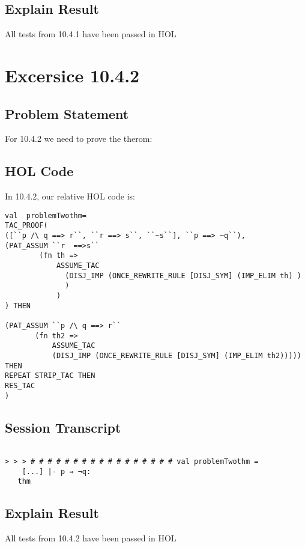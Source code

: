 \documentclass{report}
\begin{document}
\section{Explain Result}
\label{explain result 1041}
All tests from 10.4.1 have been passed in HOL



\chapter{Excersice 10.4.2}
\label{Ex 1042}
\section{Problem Statement}
\label{Problem State 1042}
For 10.4.2 we need to prove the therom:

\HOLexerciseOneZeroTheoremsproblemTwothm


\section{HOL Code}
\label{HOl Code 1042}
In 10.4.2, our relative HOL code is:
\begin{lstlisting}[frame=trBL]
val  problemTwothm=
TAC_PROOF(
([``p /\ q ==> r``, ``r ==> s``, ``~s``], ``p ==> ~q``),
(PAT_ASSUM ``r  ==>s``
	    (fn th =>
     	    ASSUME_TAC
     	      (DISJ_IMP (ONCE_REWRITE_RULE [DISJ_SYM] (IMP_ELIM th) )
              )
            )
) THEN

(PAT_ASSUM ``p /\ q ==> r``
	   (fn th2 =>
     	   ASSUME_TAC
     	   (DISJ_IMP (ONCE_REWRITE_RULE [DISJ_SYM] (IMP_ELIM th2))))) THEN
REPEAT STRIP_TAC THEN
RES_TAC
)
\end{lstlisting}

\section{Session Transcript}
\label{Session Trans 1041}
\setcounter{sessioncount}{0}
\begin{session}
  \begin{scriptsize}
\begin{verbatim}

> > > # # # # # # # # # # # # # # # # # val problemTwothm =
    [...] |- p ⇒ ¬q:
   thm
\end{verbatim}
  \end{scriptsize}
\end{session}
\section{Explain Result}
\label{explain result 1042}
All tests from 10.4.2 have been passed in HOL
\end{document}
